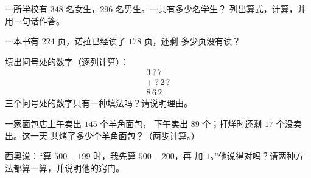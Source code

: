 \begin{exercise}[$\star$]\label{exo:g3:addsub:7}
一所学校有 $348$ 名女生，$296$ 名男生。一共有多少名学生？
列出算式，计算，并用一句话作答。
\end{exercise}

\begin{exercise}[$\star$]\label{exo:g3:addsub:8}
一本书有 $224$ 页，诺拉已经读了 $178$ 页，还剩
多少页没有读？
\end{exercise}

\begin{exercise}[$\star$]\label{exo:g3:addsub:9}
填出问号处的数字（逐列计算）：
\[
\begin{array}{r}
3\,?\,7 \\
+\ ?\,2\,? \\
\hline
8\,6\,2
\end{array}
\]
三个问号处的数字只有一种填法吗？请说明理由。
\end{exercise}

\begin{exercise}[$\star\star$]\label{exo:g3:addsub:10}
一家面包店上午卖出 $145$ 个羊角面包，
下午卖出 $89$ 个；打烊时还剩 $17$ 个没卖出。这一天
共烤了多少个羊角面包？（两步计算。）
\end{exercise}

\begin{exercise}[$\star\star$]\label{exo:g3:addsub:11}
西奥说：“算 $500 - 199$ 时，我先算 $500 - 200$，再
加 $1$。”他说得对吗？请两种方法都算一算，并说明他的窍门。
\end{exercise}

